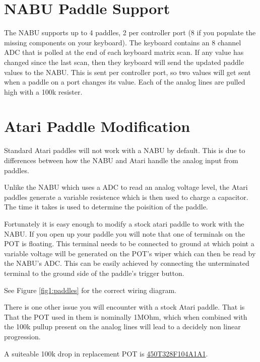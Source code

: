 \documentclass[a4paper,12pt]{article}
\begin{document}
\setlength{\parindent}{0cm}
\section*{NABU Paddle Support}
The NABU supports up to 4 paddles, 2 per controller port (8 if you populate the
missing components on your keyboard). The keyboard contains an 8 channel ADC that
is polled at the end of each keyboard matrix scan. If any value has changed since
the last scan, then they keyboard will send the updated paddle values to the NABU.
This is sent per controller port, so two values will get sent when a paddle on a
port changes its value. Each of the analog lines are pulled high with a 100k
resister.

\section*{Atari Paddle Modification}
Standard Atari paddles will not work with a NABU by default. This is due to
differences between how the NABU and Atari handle the analog input from paddles.

\bigskip

Unlike the NABU which uses a ADC to read an analog voltage level, the Atari paddles
generate a variable resistence which is then used to charge a capacitor. The time
it takes is used to determine the poisition of the paddle.

\bigskip

Fortunately it is easy enough to modify a stock atari paddle to work with the NABU.
If you open up your paddle you will note that one of terminals on the POT is floating.
This terminal needs to be connected to ground at which point a variable voltage will
be generated on the POT's wiper which can then be read by the NABU's ADC. This can be
easily achieved by connecting the unterminated terminal to the ground side of the paddle's
trigger button.

\smallskip

See Figure \ref{fig1:paddles} for the correct wiring diagram.

\bigskip

There is one other issue you will encounter with a stock Atari paddle. That is That
the POT used in them is nominally 1MOhm, which when combined with the 100k pullup
present on the analog lines will lead to a decidely non linear progression.

\medskip

A suiteable 100k drop in replacement POT is
\href{https://www.digikey.com/en/products/detail/cts-electrocomponents/450T328F104A1A1/4733114}{450T328F104A1A1}.
\end{document}
